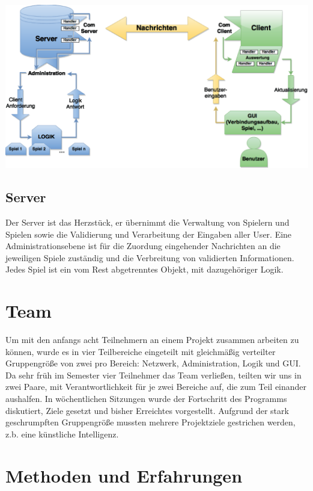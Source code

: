 \documentclass[a0, portrait, english, ngerman]{a0poster}
\begin{document}
\begin{multicols}{3}
\vspace{0.5cm}
\centering \includegraphics[scale=0.55]{images/Struktur3.eps} \\

\subsection{Server}

Der Server ist das Herzstück, er übernimmt die Verwaltung von Spielern und Spielen sowie die Validierung und Verarbeitung der Eingaben aller User. Eine Administrationsebene ist für die Zuordung eingehender Nachrichten an die jeweiligen Spiele zuständig und die Verbreitung von validierten Informationen. Jedes Spiel ist ein vom Rest abgetrenntes Objekt, mit dazugehöriger Logik.\\

\section{Team}

Um mit den anfangs acht Teilnehmern an einem Projekt zusammen arbeiten zu können, wurde es in vier Teilbereiche eingeteilt mit gleichmä\ss{}ig verteilter Gruppengrö\ss{}e von zwei pro Bereich: Netzwerk, Administration, Logik und GUI. Da sehr früh im Semester vier Teilnehmer das Team verlie\ss{}en, teilten wir uns in zwei Paare, mit Verantwortlichkeit für je zwei Bereiche auf, die zum Teil einander aushalfen. In wöchentlichen Sitzungen wurde der Fortschritt des Programms diskutiert, Ziele gesetzt und bisher Erreichtes vorgestellt. Aufgrund der stark geschrumpften Gruppengrö\ss{}e mussten mehrere Projektziele gestrichen werden, z.b. eine künstliche Intelligenz.\\

\section{Methoden und Erfahrungen}


\end{multicols}
\end{document}
